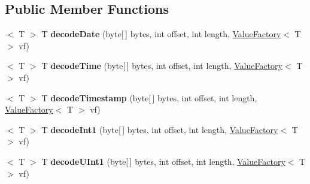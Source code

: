 \subsection*{Public Member Functions}
\begin{DoxyCompactItemize}
\item 
\mbox{\label{interfacecom_1_1mysql_1_1cj_1_1protocol_1_1_value_decoder_a177b8606021001ade615407b55126bf7}} 
$<$ T $>$ T {\bfseries decode\+Date} (byte\mbox{[}$\,$\mbox{]} bytes, int offset, int length, \mbox{\hyperlink{interfacecom_1_1mysql_1_1cj_1_1result_1_1_value_factory}{Value\+Factory}}$<$ T $>$ vf)
\item 
\mbox{\label{interfacecom_1_1mysql_1_1cj_1_1protocol_1_1_value_decoder_a242096fdfd3239b74372b3ebb5ef1a15}} 
$<$ T $>$ T {\bfseries decode\+Time} (byte\mbox{[}$\,$\mbox{]} bytes, int offset, int length, \mbox{\hyperlink{interfacecom_1_1mysql_1_1cj_1_1result_1_1_value_factory}{Value\+Factory}}$<$ T $>$ vf)
\item 
\mbox{\label{interfacecom_1_1mysql_1_1cj_1_1protocol_1_1_value_decoder_ac5b96aab39f519a84f5b1a09109cf9c0}} 
$<$ T $>$ T {\bfseries decode\+Timestamp} (byte\mbox{[}$\,$\mbox{]} bytes, int offset, int length, \mbox{\hyperlink{interfacecom_1_1mysql_1_1cj_1_1result_1_1_value_factory}{Value\+Factory}}$<$ T $>$ vf)
\item 
\mbox{\label{interfacecom_1_1mysql_1_1cj_1_1protocol_1_1_value_decoder_a643bd8a81729e75139130855c361ee44}} 
$<$ T $>$ T {\bfseries decode\+Int1} (byte\mbox{[}$\,$\mbox{]} bytes, int offset, int length, \mbox{\hyperlink{interfacecom_1_1mysql_1_1cj_1_1result_1_1_value_factory}{Value\+Factory}}$<$ T $>$ vf)
\item 
\mbox{\label{interfacecom_1_1mysql_1_1cj_1_1protocol_1_1_value_decoder_aa626496cf5956d94b25d27615093efc5}} 
$<$ T $>$ T {\bfseries decode\+U\+Int1} (byte\mbox{[}$\,$\mbox{]} bytes, int offset, int length, \mbox{\hyperlink{interfacecom_1_1mysql_1_1cj_1_1result_1_1_value_factory}{Value\+Factory}}$<$ T $>$ vf)
\item 

\end{DoxyCompactItemize}
